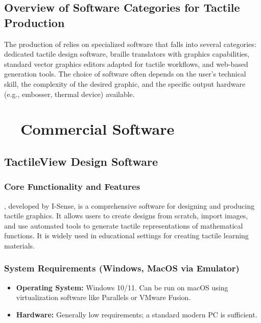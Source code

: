 \subsection{Overview of Software Categories for Tactile Production}\label{ch14:ssec:software-categories}
The production of  relies on specialized software that falls into several categories: dedicated tactile design software\supercite{TactileView}, braille translators with graphics capabilities\supercite{DuxburyDBT}, standard vector graphics editors adapted for tactile workflows\supercite{SoftorageInkscape}, and web-based generation tools\supercite{TouchMapper}. The choice of software often depends on the user's technical skill, the complexity of the desired graphic, and the specific output hardware (e.g., embosser, thermal device) available.

\section{~~Commercial  Software}\label{ch14:sec:commercial-software}
\subsection{TactileView Design Software}\label{ch14:ssec:tactileview}
\subsubsection{Core Functionality and Features}\label{ch14:sssec:tactileview-features}
, developed by I-Sense\supercite{TactileView, TactileViewIrie, EmeraldCoast}, is a comprehensive software for designing and producing tactile graphics. It allows users to create designs from scratch, import images, and use automated tools to generate tactile representations of mathematical functions. It is widely used in educational settings for creating tactile learning materials.

\subsubsection{System Requirements (Windows, MacOS via Emulator)}\label{ch14:sssec:tactileview-sysreq}
\begin{itemize}
	\item \textbf{Operating System:} Windows 10/11. Can be run on macOS using virtualization software like Parallels or VMware Fusion.
	\item \textbf{Hardware:} Generally low requirements; a standard modern PC is sufficient.
\end{itemize}

